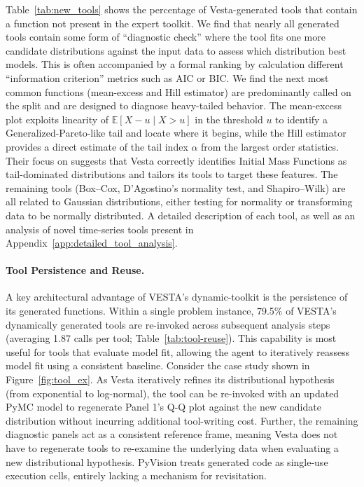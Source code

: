 \documentclass{article}
\newcommand{\method}{{\sc Vesta}}
\newcommand{\splitlabel}[3]{%
  \tikz[baseline=-0.6ex]{%
    \node[
      rounded corners=3pt,
      fill=#2,
      draw=#1,
      line width=0.8pt,
      inner xsep=4pt,
      inner ysep=2pt,
      font=\bfseries\small
    ] {#3};%
  }%
}
\newcommand{\Astro}{\splitlabel{astroblue}{astrofill}{Astro}}
\begin{document}
Table~\ref{tab:new_tools} shows the percentage of \method{}-generated tools that contain a function not present in the expert toolkit. We find that nearly all generated tools contain some form of ``diagnostic check'' where the tool fits one more candidate distributions against the input data to assess which distribution best models. This is often accompanied by a formal ranking by calculation different ``information criterion'' metrics such as AIC or BIC. We find the next most common functions (mean-excess and Hill estimator) are predominantly called on the \protect\Astro{} split and are designed to diagnose heavy-tailed behavior. The mean-excess plot exploits linearity of $\mathbb{E}[X - u \mid X > u]$ in the threshold $u$ to identify a Generalized-Pareto-like tail and locate where it begins, while the Hill estimator provides a direct estimate of the tail index $\alpha$ from the largest order statistics. Their focus on \protect\Astro{} suggests that \method{} correctly identifies Initial Mass Functions as tail-dominated distributions and tailors its tools to target these features. The remaining tools (Box–Cox, D'Agostino's normality test, and Shapiro–Wilk) are all related to Gaussian distributions, either testing for normality or transforming data to be normally distributed. A detailed description of each tool, as well as an analysis of novel time-series tools present in Appendix~\ref{app:detailed_tool_analysis}.

\vspace{-0.3em}
\paragraph{Tool Persistence and Reuse.}
A key architectural advantage of VESTA's dynamic-toolkit is the persistence of its generated functions. Within a single problem instance, 79.5\% of VESTA's dynamically generated tools are re-invoked across subsequent analysis steps (averaging 1.87 calls per tool; Table~\ref{tab:tool-reuse}). This capability is most useful for tools that evaluate model fit, allowing the agent to iteratively reassess model fit using a consistent baseline. Consider the case study shown in Figure~\ref{fig:tool_ex}. As \method{} iteratively refines its distributional hypothesis (from exponential to log-normal), the tool can be re-invoked with an updated PyMC model to regenerate Panel 1's Q-Q plot against the new candidate distribution without incurring additional tool-writing cost. Further, the remaining diagnostic panels act as a consistent reference frame, meaning \method{} does not have to regenerate tools to re-examine the underlying data when evaluating a new distributional hypothesis. PyVision treats generated code as single-use execution cells, entirely lacking a mechanism for revisitation.
\end{document}
